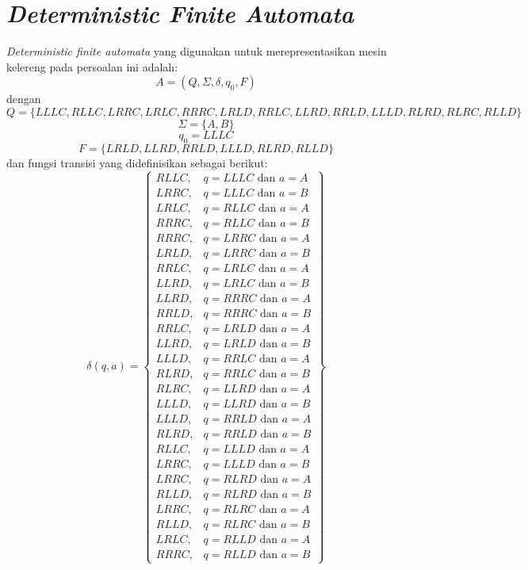 \documentclass[a4paper,titlepage]{article}
\begin{document}
	\section{\textit{Deterministic Finite Automata}}

		\textit{Deterministic finite automata} yang digunakan untuk merepresentasikan mesin kelereng pada persoalan ini adalah:
		\[A = (Q, \Sigma, \delta, q_0, F)\]
		dengan
		\[Q = \{LLLC, RLLC, LRRC, LRLC, RRRC, LRLD, RRLC, LLRD, RRLD, LLLD, RLRD, RLRC, RLLD\}\]
		\[\Sigma = \{A, B\}\]
		\[q_0 = LLLC\]
		\[F = \{LRLD, LLRD, RRLD, LLLD, RLRD, RLLD\}\]
		dan fungsi transisi yang didefinisikan sebagai berikut:
		\[
			\delta(q, a) = \left\{
				\begin{array}{lr}
					RLLC, & q = LLLC \text{ dan } a = A\\
					LRRC, & q = LLLC \text{ dan } a = B\\
					LRLC, & q = RLLC \text{ dan } a = A\\
					RRRC, & q = RLLC \text{ dan } a = B\\
					RRRC, & q = LRRC \text{ dan } a = A\\
					LRLD, & q = LRRC \text{ dan } a = B\\
					RRLC, & q = LRLC \text{ dan } a = A\\
					LLRD, & q = LRLC \text{ dan } a = B\\
					LLRD, & q = RRRC \text{ dan } a = A\\
					RRLD, & q = RRRC \text{ dan } a = B\\
					RRLC, & q = LRLD \text{ dan } a = A\\
					LLRD, & q = LRLD \text{ dan } a = B\\
					LLLD, & q = RRLC \text{ dan } a = A\\
					RLRD, & q = RRLC \text{ dan } a = B\\
					RLRC, & q = LLRD \text{ dan } a = A\\
					LLLD, & q = LLRD \text{ dan } a = B\\
					LLLD, & q = RRLD \text{ dan } a = A\\
					RLRD, & q = RRLD \text{ dan } a = B\\
					RLLC, & q = LLLD \text{ dan } a = A\\
					LRRC, & q = LLLD \text{ dan } a = B\\
					LRRC, & q = RLRD \text{ dan } a = A\\
					RLLD, & q = RLRD \text{ dan } a = B\\
					LRRC, & q = RLRC \text{ dan } a = A\\
					RLLD, & q = RLRC \text{ dan } a = B\\
					LRLC, & q = RLLD \text{ dan } a = A\\
					RRRC, & q = RLLD \text{ dan } a = B
				\end{array}
			\right\}
		\]
\end{document}
